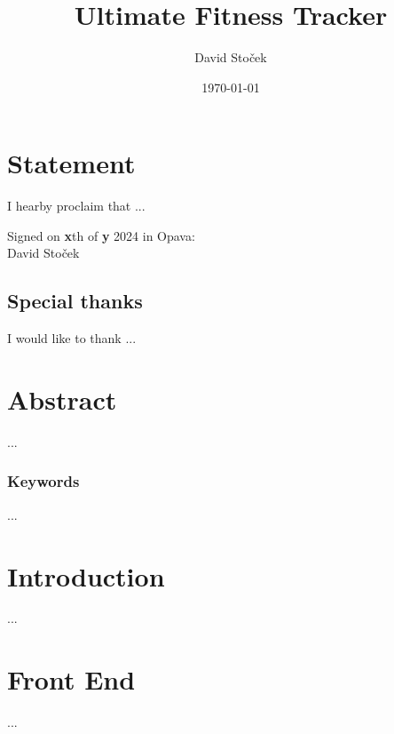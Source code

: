 \documentclass[a4paper]{article}
\title{Ultimate Fitness Tracker}
\author{David Stoček}
\date{\today}
\begin{document}
	
	\maketitle	
	\pagebreak
	
	\vspace*{\fill}
	\section*{Statement}
	I hearby proclaim that ...\\
	\begin{flushright}
	Signed on \textbf{x}th of \textbf{y} 2024 in Opava:\\
	David Stoček
	\vspace*{\fill}
	\end{flushright}
	\pagebreak
	
	\subsection*{Special thanks}
	I would like to thank ...
	\pagebreak
	
	\section*{Abstract}
	...
	
	\subsubsection*{Keywords}
	...
	
	\pagebreak
	
	\tableofcontents
	\pagebreak
	
	\pagestyle{fancy}
	\fancyhead{} %
	\fancyhead[HR]{\today}
	
	\section*{Introduction}
	... 
	\pagebreak
	
	\section{Front End}
	...
\end{document}
